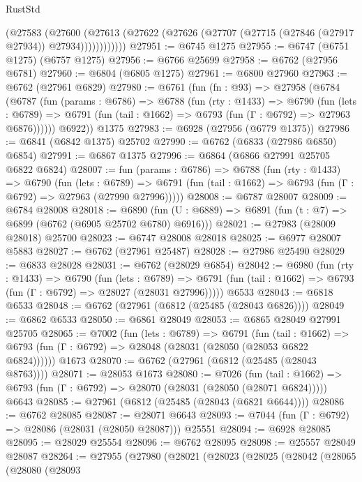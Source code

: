 \begin{lexlean}{RustStd}
\begin{coremodule}
              (@27583
                (@27600
                  (@27613
                    (@27622 (@27626 (@27707 (@27715 (@27846 (@27917 @27934)) @27934))))))))))))
@27951 := @6745 @1275
@27955 := @6747 (@6751 @1275) (@6757 @1275)
@27956 := @6766 @25699
@27958 := @6762 (@27956 @6781)
@27960 := @6804 (@6805 @1275)
@27961 := @6800 @27960
@27963 := @6762 (@27961 @6829)
@27980 := @6761
    (fun (fn : @93) =>
    @27958
      (@6784
        (@6787
          (fun (params : @6786) =>
          @6788
            (fun (rty : @1433) =>
            @6790
              (fun (lets : @6789) =>
              @6791 (fun (tail : @1662) => @6793 (fun (Γ : @6792) => @27963 @6876))))))
        @6922))
    @1375
@27983 := @6928 (@27956 (@6779 @1375))
@27986 := @6841 (@6842 @1375) @25702
@27990 := @6762 (@6833 (@27986 @6850) @6854)
@27991 := @6867 @1375
@27996 := @6864 (@6866 @27991 @25705 @6822 @6824)
@28007 := fun (params : @6786) =>
  @6788
    (fun (rty : @1433) =>
    @6790
      (fun (lets : @6789) =>
      @6791 (fun (tail : @1662) => @6793 (fun (Γ : @6792) => @27963 (@27990 @27996)))))
@28008 := @6787 @28007
@28009 := @6784 @28008
@28018 := @6890
    (fun (U : @6889) => @6891 (fun (t : @7) => @6899 (@6762 (@6905 @25702 @6780) @6916)))
@28021 := @27983 (@28009 @28018) @25700
@28023 := @6747 @28008 @28018
@28025 := @6977 @28007 @5883
@28027 := @6762 (@27961 @25487)
@28028 := @27986 @25490
@28029 := @6833 @28028
@28031 := @6762 (@28029 @6854)
@28042 := @6980
    (fun (rty : @1433) =>
    @6790
      (fun (lets : @6789) =>
      @6791 (fun (tail : @1662) => @6793 (fun (Γ : @6792) => @28027 (@28031 @27996)))))
    @6533
@28043 := @6818 @6533
@28048 := @6762 (@27961 (@6812 (@25485 (@28043 @6826))))
@28049 := @6862 @6533
@28050 := @6861 @28049
@28053 := @6865 @28049 @27991 @25705
@28065 := @7002
    (fun (lets : @6789) =>
    @6791
      (fun (tail : @1662) =>
      @6793 (fun (Γ : @6792) => @28048 (@28031 (@28050 (@28053 @6822 @6824))))))
    @1673
@28070 := @6762 (@27961 (@6812 (@25485 (@28043 @8763))))
@28071 := @28053 @1673
@28080 := @7026
    (fun (tail : @1662) => @6793 (fun (Γ : @6792) => @28070 (@28031 (@28050 (@28071 @6824)))))
    @6643
@28085 := @27961 (@6812 (@25485 (@28043 (@6821 @6644))))
@28086 := @6762 @28085
@28087 := @28071 @6643
@28093 := @7044 (fun (Γ : @6792) => @28086 (@28031 (@28050 @28087))) @25551
@28094 := @6928 @28085
@28095 := @28029 @25554
@28096 := @6762 @28095
@28098 := @25557 @28049 @28087
@28264 := @27955
    (@27980
      (@28021
        (@28023
          (@28025
            (@28042
              (@28065
                (@28080
                  (@28093

\end{coremodule}
\end{lexlean}
